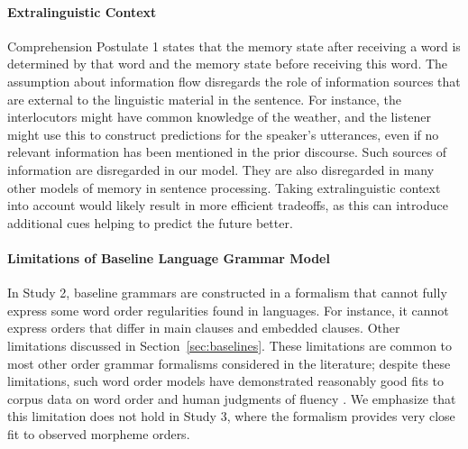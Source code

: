 \paragraph{Extralinguistic Context}
Comprehension Postulate 1 states that the memory state after receiving a word is determined by that word and the memory state before receiving this word.
The assumption about information flow disregards the role of information sources that are external to the linguistic material in the sentence.
For instance, the interlocutors might have common knowledge of the weather, and the listener might use this to construct predictions for the speaker's utterances, even if no relevant information has been mentioned in the prior discourse.
Such sources of information are disregarded in our model.
They are also disregarded in many other models of memory in sentence processing.
Taking extralinguistic context into account would likely result in more efficient tradeoffs, as this can introduce additional cues helping to predict the future better.


\paragraph{Limitations of Baseline Language Grammar Model}
In Study 2, baseline grammars are constructed in a formalism that cannot fully express some word order regularities found in languages.
For instance, it cannot express orders that differ in main clauses and embedded clauses. 
Other limitations discussed in Section~\ref{sec:baselines}.
These limitations are common to most other order grammar formalisms considered in the literature; despite these limitations, such word order models have demonstrated reasonably good fits to corpus data on word order and human judgments of fluency \citep{futrell2015experiments,wang2016galactic}.
We emphasize that this limitation does not hold in Study 3, where the formalism provides very close fit to observed morpheme orders.



